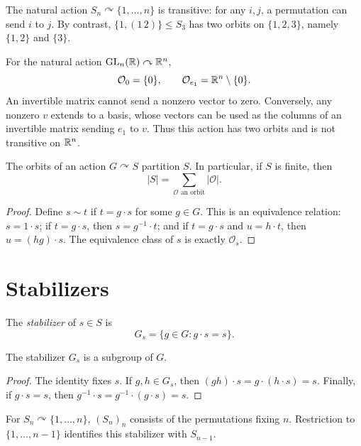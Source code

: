 \documentclass[reqno,11pt]{amsart}
\begin{document}
\begin{example}
The natural action $S_n\curvearrowright\{1,\ldots,n\}$ is
transitive: for any $i,j$, a permutation can send $i$ to $j$.
By contrast, $\{1,(1\,2)\}\leq S_3$ has two orbits on
$\{1,2,3\}$, namely $\{1,2\}$ and $\{3\}$.
\end{example}

\begin{example}
For the natural action $\operatorname{GL}_n(\mathbb{R})\curvearrowright\mathbb{R}^n$,
\[
  \mathcal O_0=\{0\},\qquad
  \mathcal O_{e_1}=\mathbb{R}^n\setminus\{0\}.
\]
An invertible matrix cannot send a nonzero vector to zero.
Conversely, any nonzero $v$ extends to a basis, whose vectors can
be used as the columns of an invertible matrix sending $e_1$ to $v$.
Thus this action has two orbits and is not transitive on $\mathbb{R}^n$.
\end{example}

\begin{proposition}\label{prop:orbit-partition}
The orbits of an action $G\curvearrowright S$ partition $S$.
In particular, if $S$ is finite, then
\[
  |S|=\sum_{\mathcal O\text{ an orbit}}|\mathcal O|.
\]
\end{proposition}
\begin{proof}
Define $s\sim t$ if $t=g\cdot s$ for some $g\in G$.
This is an equivalence relation: $s=1\cdot s$;
if $t=g\cdot s$, then $s=g^{-1}\cdot t$; and if
$t=g\cdot s$ and $u=h\cdot t$, then $u=(hg)\cdot s$.
The equivalence class of $s$ is exactly $\mathcal O_s$.
\end{proof}

\section{Stabilizers}

\begin{define}[Stabilizer]\label{def:stabilizer}
The \emph{stabilizer} of $s\in S$ is
\[
  G_s=\{g\in G:g\cdot s=s\}.
\]
\end{define}

\begin{lemma}\label{lem:stabilizer-subgroup}
The stabilizer $G_s$ is a subgroup of $G$.
\end{lemma}
\begin{proof}
The identity fixes $s$. If $g,h\in G_s$, then
$(gh)\cdot s=g\cdot(h\cdot s)=s$. Finally, if $g\cdot s=s$,
then $g^{-1}\cdot s=g^{-1}\cdot(g\cdot s)=s$.
\end{proof}

\begin{example}
For $S_n\curvearrowright\{1,\ldots,n\}$,
$(S_n)_n$ consists of the permutations fixing $n$. Restriction to
$\{1,\ldots,n-1\}$ identifies this stabilizer with $S_{n-1}$.
\end{example}
\end{document}
